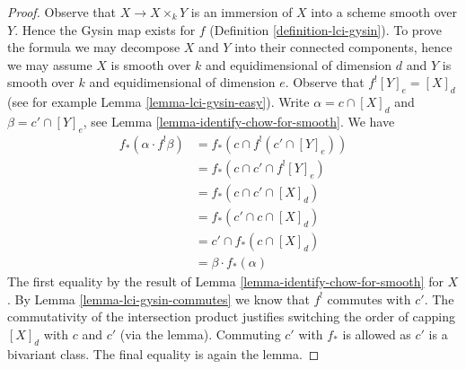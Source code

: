 \documentclass[10pt,a4paper]{amsart}
\theoremstyle{plain}
\theoremstyle{definition}
\theoremstyle{remark}
\numberwithin{equation}{subsection}
\begin{document}
\begin{proof}
Observe that $X \to X \times_k Y$ is an immersion of $X$ into a scheme
smooth over $Y$. Hence the Gysin map exists for $f$
(Definition \ref{definition-lci-gysin}).
To prove the formula we may decompose $X$ and $Y$ into their
connected components, hence we may assume $X$ is smooth over $k$
and equidimensional of dimension $d$ and $Y$ is smooth over $k$
and equidimensional of dimension $e$. Observe that
$f^![Y]_e = [X]_d$ (see for example Lemma \ref{lemma-lci-gysin-easy}).
Write $\alpha = c \cap [X]_d$ and $\beta = c' \cap [Y]_e$,
see Lemma \ref{lemma-identify-chow-for-smooth}. We have
\begin{align*}
f_*(\alpha \cdot f^!\beta)
& =
f_*(c \cap f^!(c' \cap [Y]_e)) \\
& =
f_*(c \cap c' \cap f^![Y]_e) \\
& =
f_*(c \cap c' \cap [X]_d) \\
& =
f_*(c' \cap c \cap [X]_d) \\
& =
c' \cap f_*(c \cap [X]_d) \\
& =
\beta \cdot f_*(\alpha)
\end{align*}
The first equality by the result of Lemma \ref{lemma-identify-chow-for-smooth}
for $X$. By Lemma \ref{lemma-lci-gysin-commutes} we know that $f^!$
commutes with $c'$. The commutativity of the intersection
product justifies switching the order of capping $[X]_d$ with $c$ and $c'$
(via the lemma). Commuting $c'$ with $f_*$ is allowed as $c'$
is a bivariant class. The final equality is again the lemma.
\end{proof}
\end{document}
